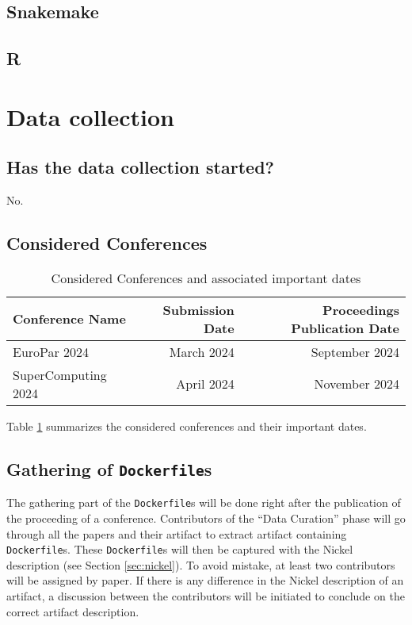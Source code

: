 \documentclass{article}
\newcommand{\noteqg}{\todo[backgroundcolor=blue!10,bordercolor=blue,inline,caption={}]}
\newcommand{\dfile}{\texttt{Dockerfile}}
\begin{document}
\subsection{Snakemake}

\subsection{R}

\section{Data collection}

\subsection{Has the data collection started?}

No.

\subsection{Considered Conferences}

\begin{table}
  \centering
  \begin{tabular}{lrr}
    \toprule
    Conference Name     & Submission Date & Proceedings Publication Date\\
    \midrule
    EuroPar 2024        & March 2024      & September 2024\\
    SuperComputing 2024 & April 2024      & November 2024 \\
    \bottomrule
\end{tabular}
  \caption{Considered Conferences and associated important dates}
  \label{tab:conferences}
\end{table}

Table \ref{tab:conferences} summarizes the considered conferences and their important dates.

\noteqg{todo}

\subsection{Gathering of \dfile s}

The gathering part of the \dfile s will be done right after the publication of the proceeding of a conference.
Contributors of the ``Data Curation'' phase will go through all the papers and their artifact to extract artifact containing \dfile s.
These \dfile s will then be captured with the Nickel description (see Section \ref{sec:nickel}).
To avoid mistake, at least two contributors will be assigned by paper.
If there is any difference in the Nickel description of an artifact, a discussion between the contributors will be initiated to conclude on the correct artifact description.
\end{document}
